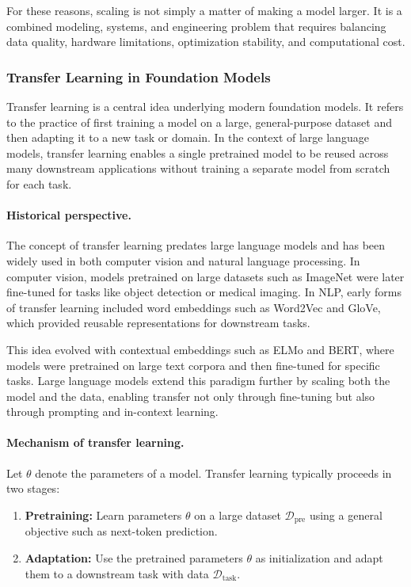 \documentclass{article}
\begin{document}
For these reasons, scaling is not simply a matter of making a model larger. It is a combined modeling, systems, and engineering problem that requires balancing data quality, hardware limitations, optimization stability, and computational cost.

\subsubsection{Transfer Learning in Foundation Models}

Transfer learning is a central idea underlying modern foundation models. It refers to the practice of first training a model on a large, general-purpose dataset and then adapting it to a new task or domain. In the context of large language models, transfer learning enables a single pretrained model to be reused across many downstream applications without training a separate model from scratch for each task.

\paragraph{Historical perspective.}
The concept of transfer learning predates large language models and has been widely used in both computer vision and natural language processing. In computer vision, models pretrained on large datasets such as ImageNet were later fine-tuned for tasks like object detection or medical imaging. In NLP, early forms of transfer learning included word embeddings such as Word2Vec and GloVe, which provided reusable representations for downstream tasks.

This idea evolved with contextual embeddings such as ELMo and BERT, where models were pretrained on large text corpora and then fine-tuned for specific tasks. Large language models extend this paradigm further by scaling both the model and the data, enabling transfer not only through fine-tuning but also through prompting and in-context learning.

\paragraph{Mechanism of transfer learning.}
Let $\theta$ denote the parameters of a model. Transfer learning typically proceeds in two stages:

\begin{enumerate}
    \item \textbf{Pretraining:} Learn parameters $\theta$ on a large dataset $\mathcal{D}_{\text{pre}}$ using a general objective such as next-token prediction.
    \item \textbf{Adaptation:} Use the pretrained parameters $\theta$ as initialization and adapt them to a downstream task with data $\mathcal{D}_{\text{task}}$.
\end{enumerate}
\end{document}
